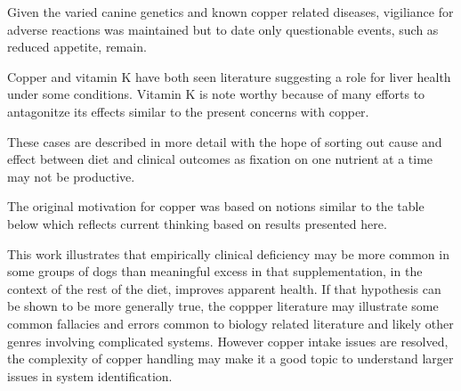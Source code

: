 {{Given the varied canine genetics and known copper related
diseases, vigiliance for adverse reactions was maintained
but to date only questionable events, such as reduced
appetite, remain. 

Copper and vitamin K have both seen literature suggesting
a role for liver health under some conditions. Vitamin K is
note worthy because of many efforts to antagonitze
its effects similar to the present  concerns with copper. 

 
These cases are described in more detail with the hope of
sorting out cause and effect between diet and clinical
outcomes as fixation on one nutrient at  a time may not
be productive. 


The original motivation for copper was based on notions
similar to the table below which reflects current
thinking based on results presented here. 


This work illustrates that empirically clinical deficiency
may be more common in some groups of dogs than meaningful excess
in that supplementation, in the context of the rest of the 
diet,  improves apparent health.
If that hypothesis can be shown to be more generally
true, the coppper literature may illustrate some common
fallacies and errors common to biology related
literature and likely other genres involving complicated
systems. 
However copper intake issues are resolved, the complexity of
copper handling may make it a good topic to understand larger
issues in system identification. 
}

} %



